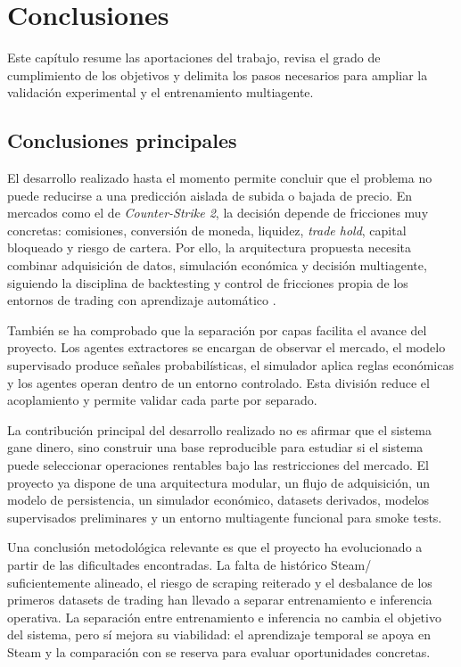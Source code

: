 \chapter{Conclusiones}

\noindent Este capítulo resume las aportaciones del trabajo, revisa el grado de cumplimiento de los objetivos y delimita los pasos necesarios para ampliar la validación experimental y el entrenamiento multiagente.

\section{Conclusiones principales}

El desarrollo realizado hasta el momento permite concluir que el problema no puede reducirse a una predicción aislada de subida o bajada de precio. En mercados como el de \textit{Counter-Strike 2}, la decisión depende de fricciones muy concretas: comisiones, conversión de moneda, liquidez, \textit{trade hold}, capital bloqueado y riesgo de cartera. Por ello, la arquitectura propuesta necesita combinar adquisición de datos, simulación económica y decisión multiagente, siguiendo la disciplina de backtesting y control de fricciones propia de los entornos de trading con aprendizaje automático \cite{liu2021finrl}.

También se ha comprobado que la separación por capas facilita el avance del proyecto. Los agentes extractores se encargan de observar el mercado, el modelo supervisado produce señales probabilísticas, el simulador aplica reglas económicas y los agentes  operan dentro de un entorno controlado. Esta división reduce el acoplamiento y permite validar cada parte por separado.

La contribución principal del desarrollo realizado no es afirmar que el sistema gane dinero, sino construir una base reproducible para estudiar si el sistema puede seleccionar operaciones rentables bajo las restricciones del mercado. El proyecto ya dispone de una arquitectura modular, un flujo de adquisición, un modelo de persistencia, un simulador económico, datasets derivados, modelos supervisados preliminares y un entorno multiagente funcional para smoke tests.

Una conclusión metodológica relevante es que el proyecto ha evolucionado a partir de las dificultades encontradas. La falta de histórico Steam/ suficientemente alineado, el riesgo de scraping reiterado y el desbalance de los primeros datasets de trading han llevado a separar entrenamiento e inferencia operativa. La separación entre entrenamiento e inferencia no cambia el objetivo del sistema, pero sí mejora su viabilidad: el aprendizaje temporal se apoya en Steam y la comparación con  se reserva para evaluar oportunidades concretas.


